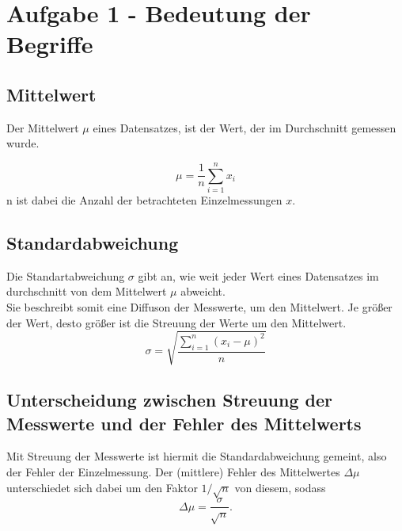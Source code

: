 \section*{Aufgabe 1 - Bedeutung der Begriffe}
\subsection*{Mittelwert}
    Der Mittelwert $\mu$ eines Datensatzes, ist der Wert, der im Durchschnitt gemessen wurde.

    \begin{equation*}
        \mu=\frac{1}{n}\sum_{i=1}^n x_i
    \end{equation*}
    n ist dabei die Anzahl der betrachteten Einzelmessungen $x$.
\subsection*{Standardabweichung}
    Die Standartabweichung $\sigma$ gibt an, wie weit jeder Wert eines Datensatzes im durchschnitt von 
    dem Mittelwert $\mu$ abweicht.\\
    Sie beschreibt somit eine Diffuson der Messwerte, um den Mittelwert. Je größer der Wert, desto
    größer ist die Streuung der Werte um den Mittelwert.
    \begin{equation*}
        \sigma = \sqrt{\frac{\sum_{i=1}^n(x_i-\mu)^2}{n}}
    \end{equation*}
\subsection*{Unterscheidung zwischen Streuung der Messwerte und der Fehler des Mittelwerts}
    Mit Streuung der Messwerte ist hiermit die Standardabweichung gemeint, also der Fehler der Einzelmessung.
    Der (mittlere) Fehler des Mittelwertes $\Delta \mu$ unterschiedet sich dabei um den Faktor $1/\sqrt{n}$ von diesem, sodass
    \begin{equation*}
        \Delta \mu = \frac{\sigma}{\sqrt{n}}.
    \end{equation*}
